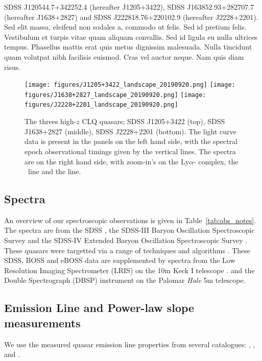 \documentclass[a4paper,fleqn,usenatbib]{mnras}
\begin{document}
SDSS J120544.7+342252.4  (hereafter J1205+3422), 
SDSS J163852.93+282707.7 (hereafter J1638+2827) and
SDSS J222818.76+220102.9 (hereafter J2228+2201). 
Sed elit massa, eleifend non sodales a, commodo ut felis. Sed id
pretium felis. Vestibulum et turpis vitae quam aliquam convallis. Sed
id ligula eu nulla ultrices tempus. Phasellus mattis erat quis metus
dignissim malesuada. Nulla tincidunt quam volutpat nibh facilisis
euismod. Cras vel auctor neque. Nam quis diam risus.




\begin{figure}
  \centering
  \texttt{[image: figures/J1205+3422\_landscape\_20190920.png]}
  \texttt{[image: figures/J1638+2827\_landscape\_20190920.png]}
  \texttt{[image: figures/J2228+2201\_landscape\_20190920.png]}
  \vspace{-12pt}
  \caption[]{The threes high-$z$ CLQ quasars; 
    SDSS J1205+3422 (top), 
    SDSS J1638+2827 (middle), 
    SDSS J2228+2201 (bottom). 
The light curve data is present in the panels on the left hand side, with the 
spectral epoch observational timings given by the vertical lines. 
The spectra are on the right hand side, with zoom-in's on the Ly$\alpha$-\nv 
complex, the \civ\ line and the \mgii line. 
  }
  \label{fig:civ_clqs}
\end{figure}
\subsection{Spectra}
An overview of our spectroscopic observations is given in
Table~\ref{tab:obs_notes}.  The spectra are from the SDSS
\citep{Stoughton2002, DR7, Schneider2010}, the SDSS-III Baryon
Oscillation Spectroscopic Survey \citep[BOSS][]{Eisenstein2011,
Dawson2013, Smee2013, Alam2015, Paris2017} and the SDSS-IV Extended
Baryon Oscillation Spectroscopic Survey \citep[eBOSS; ][]{Dawson2016,
Abolfathi2018, Paris2018}.  These quasars were targetted via a range
of techniques and algorithms \citep[see ][]{Richards2002, Ross2012,
Myers2015}. These SDSS, BOSS and eBOSS data are supplemented by
spectra from the Low Resolution Imaging Spectrometer (LRIS) on the 10m
Keck {\sc I} telescope \citep{Oke1995}.  and the Double Spectrograph
(DBSP) instrument on the Palomar {\it Hale} 5m telescope.


\subsection{Emission Line and Power-law slope measurements}
We use the measured quasar emission line properties from several catalogues: 
\citet{Shen2011}, \citet{Hamann2017}, \citet{Kozlowski2017} and
\citet{Calderone2017}.
\end{document}
